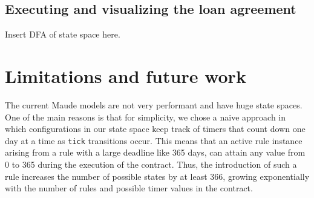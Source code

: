 \documentclass{article}
\begin{document}


\subsection{Executing and visualizing the loan agreement}
Insert DFA of state space here.




\section{Limitations and future work}
The current Maude models are not very performant and have huge state spaces.
One of the main reasons is that for simplicity, we chose a naive approach in
which configurations in our state space keep track of timers that count down
one day at a time as \texttt{tick} transitions occur.
This means that an active rule instance arising from a rule with a large deadline
like 365 days, can attain any value from 0 to 365 during the execution of the
contract.
Thus, the introduction of such a rule increases the number of possible states
by at least 366, growing exponentially with the number of rules and possible
timer values in the contract.
\end{document}
